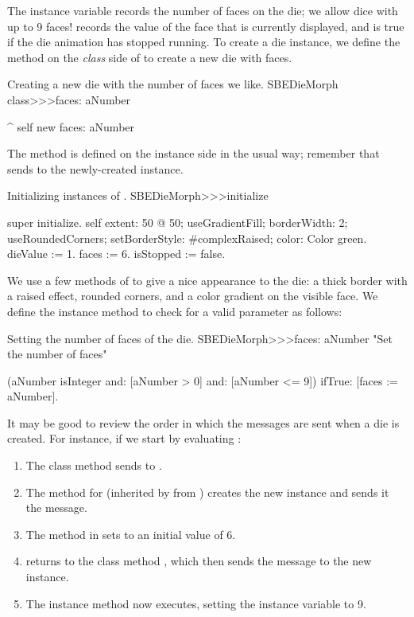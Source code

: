 \documentclass[a4paper,10pt,twoside]{book}
\begin{document}
The instance variable  records the number of faces on the die; we allow dice with up to 9 faces!
 records the value of the face that is currently displayed, and  is true if the die animation has stopped running.
To create a die instance, we define the  method on the \emph{class} side of  to create a new die with  faces.
\begin{method}{Creating a new die with the number of faces we like.}
SBEDieMorph class>>>faces: aNumber

	^ self new faces: aNumber
\end{method}

The  method is defined on the instance side in the usual way; remember that  sends  to the newly-created instance.
\begin{method}{Initializing instances of .}
SBEDieMorph>>>initialize

	super initialize.
	self 
		extent: 50 @ 50;
		useGradientFill; borderWidth: 2; useRoundedCorners;
		setBorderStyle: #complexRaised;
		color: Color green.
	dieValue := 1.
	faces := 6.
	isStopped := false.
\end{method}

We use a few methods of  to give a nice appearance to the die: a thick border with a raised effect, rounded corners, and a color gradient on the visible face.
We define the instance method  to check for a valid parameter as follows:
\begin{method}{Setting the number of faces of the die.}
SBEDieMorph>>>faces: aNumber
	"Set the number of faces"

	(aNumber isInteger
			and: [aNumber > 0]
			and: [aNumber <= 9])
		ifTrue: [faces := aNumber].
\end{method}

It may be good to review the order in which the messages are sent when a die is created.
For instance, if we start by evaluating :
\begin{enumerate}
	\item The class method  sends  to .
	\item The method for  (inherited by  from ) creates the new instance and sends it the  message.
	\item The  method in  sets  to an initial value of 6.
	\item {} returns to the class method , which then sends the message  to the new instance.
	\item The instance method  now executes, setting the  instance variable to 9.
\end{enumerate}
\end{document}

